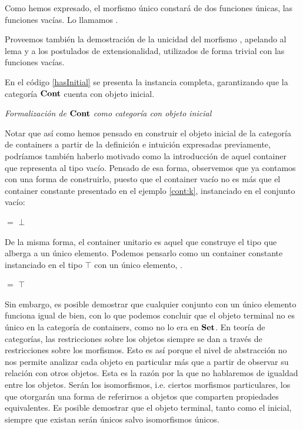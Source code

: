 
Como hemos expresado, el morfismo único constará de dos funciones únicas, las funciones vacías. Lo llamamos .


Proveemos también la demostración de la unicidad del morfismo , apelando al lema  y a los postulados de extensionalidad, utilizados de forma trivial con las funciones vacías. 



En el código \ref{hasInitial} se presenta la instancia completa, garantizando que la categoría $\mathbf{Cont}$ cuenta con objeto inicial. 

\begin{agdacode}{\it Formalización de $\mathbf{Cont}$ como categoría con objeto inicial} \label{hasInitial}

\end{agdacode}


Notar que así como hemos pensado en construir el objeto inicial de la categoría de containers a partir de la definición e intuición expresadas previamente, podríamos también haberlo motivado como la introducción de aquel container que representa al tipo vacío. Pensado de esa forma, observemos que ya contamos con una forma de construirlo, puesto que el container vacío no es más que el container constante presentado en el ejemplo \ref{cont:k}, instanciado en el conjunto vacío:

\sangrar
{} $=$  $\bot$


De la misma forma, el container unitario es aquel que construye el tipo que alberga a un único elemento. Podemos pensarlo como un container constante instanciado en el tipo $\top$ con un único elemento, .

\sangrar
{} $=$  $\top$

Sin embargo, es posible demostrar que cualquier conjunto con un único elemento funciona igual de bien, con lo que podemos concluir que el objeto terminal no es único en la categoría de containers, como no lo era en $\mathbf{Set}$.
En teoría de categorías, las restricciones sobre los objetos siempre se dan a través de restricciones sobre los morfismos.
Esto es así porque el nivel de abstracción no nos permite analizar cada objeto en particular más que a partir de observar su relación con otros objetos. Esta es la razón por la que no hablaremos de igualdad entre los objetos. Serán los isomorfismos, i.e. ciertos morfismos particulares, los que otorgarán una forma de referirnos a objetos que comparten propiedades equivalentes.   
Es posible demostrar que el objeto terminal, tanto como el inicial, siempre que existan serán únicos salvo isomorfismos únicos.

